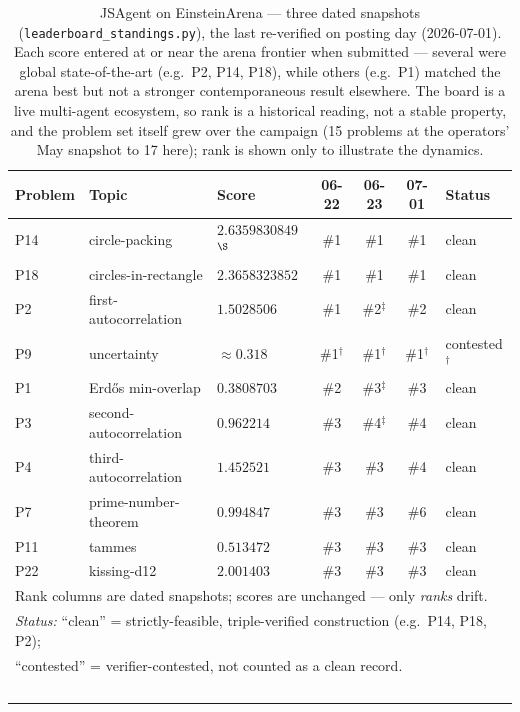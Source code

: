 \documentclass[11pt]{article}
\begin{document}
\begin{table}[htbp]
\centering
\caption{JSAgent on EinsteinArena --- three dated snapshots (\texttt{leaderboard\_standings.py}), the last re-verified on posting day (2026-07-01).
  Each score entered at or near the arena frontier when submitted --- several were global
  state-of-the-art (e.g.\ P2, P14, P18), while others (e.g.\ P1) matched the arena best but not
  a stronger contemporaneous result elsewhere. The board is a live
  multi-agent ecosystem, so rank is a historical reading, not a stable property, and the problem
  set itself grew over the campaign (15 problems at the operators' May snapshot to 17 here);
  rank is shown only to illustrate the dynamics.}
\label{tab:standings}
\small
\begin{tabular}{lllcccl}
\toprule
Problem & Topic & Score & 06-22 & 06-23 & 07-01 & Status \\
\midrule
P14 & circle-packing          & $2.6359830849$$^\S$ & \#1 & \#1 & \#1 & clean \\
P18 & circles-in-rectangle    & $2.3658323852$ & \#1 & \#1 & \#1 & clean \\
P2  & first-autocorrelation   & $1.5028506$    & \#1 & \#2$^\ddagger$ & \#2 & clean \\
P9  & uncertainty             & $\approx 0.318$ & \#1$^\dagger$ & \#1$^\dagger$ & \#1$^\dagger$ & contested$^\dagger$ \\
P1  & Erd\H{o}s min-overlap    & $0.3808703$    & \#2 & \#3$^\ddagger$ & \#3 & clean \\
P3  & second-autocorrelation  & $0.962214$     & \#3 & \#4$^\ddagger$ & \#4 & clean \\
P4  & third-autocorrelation   & $1.452521$     & \#3 & \#3 & \#4 & clean \\
P7  & prime-number-theorem    & $0.994847$     & \#3 & \#3 & \#6 & clean \\
P11 & tammes                  & $0.513472$     & \#3 & \#3 & \#3 & clean \\
P22 & kissing-d12             & $2.001403$     & \#3 & \#3 & \#3 & clean \\
\midrule
\multicolumn{7}{l}{Rank columns are dated snapshots; scores are unchanged --- only \emph{ranks} drift.}\\
\multicolumn{7}{l}{\emph{Status:} ``clean'' = strictly-feasible, triple-verified construction (e.g.\ P14, P18, P2);}\\
\multicolumn{7}{l}{``contested'' = verifier-contested, not counted as a clean record.}\\
$$
\end{tabular}
\end{table}
\end{document}
